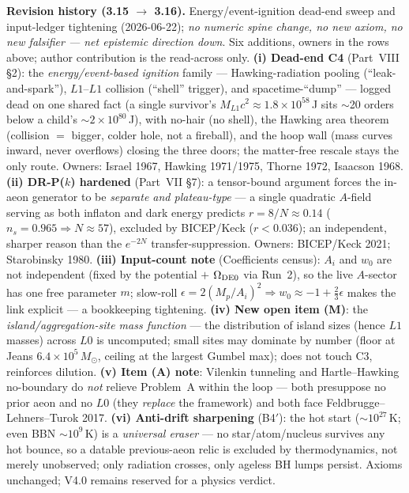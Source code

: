 \documentclass[11pt]{article}
\newcommand{\msun}{M_\odot}
\begin{document}
\smallskip\noindent\textbf{Revision history (3.15 $\to$ 3.16).} Energy/event-ignition dead-end sweep and input-ledger tightening (2026-06-22); \emph{no numeric spine change, no new axiom, no new falsifier --- net epistemic direction down}. Six additions, owners in the rows above; author contribution is the read-across only. \textbf{(i) Dead-end C4} (Part~VIII \S2): the \emph{energy/event-based ignition} family --- Hawking-radiation pooling (``leak-and-spark''), $L1$--$L1$ collision (``shell'' trigger), and spacetime-``dump'' --- logged dead on one shared fact (a single survivor's $M_{L1}c^2\approx1.8\times10^{58}$\,J sits $\sim$20 orders below a child's $\sim2\times10^{80}$\,J), with no-hair (no shell), the Hawking area theorem (collision $=$ bigger, colder hole, not a fireball), and the hoop wall (mass curves inward, never overflows) closing the three doors; the matter-free rescale stays the only route. Owners: Israel 1967, Hawking 1971/1975, Thorne 1972, Isaacson 1968. \textbf{(ii) DR-P($k$) hardened} (Part~VII \S7): a tensor-bound argument forces the in-aeon generator to be \emph{separate and plateau-type} --- a single quadratic $A$-field serving as both inflaton and dark energy predicts $r=8/N\approx0.14$ ($n_s=0.965\Rightarrow N\approx57$), excluded by BICEP/Keck ($r<0.036$); an independent, sharper reason than the $e^{-2N}$ transfer-suppression. Owners: BICEP/Keck 2021; Starobinsky 1980. \textbf{(iii) Input-count note} (Coefficients census): $A_i$ and $w_0$ are not independent (fixed by the potential $+$ $\Omega_{\rm DE0}$ via Run~2), so the live $A$-sector has one free parameter $m$; slow-roll $\epsilon=2(M_p/A_i)^2\Rightarrow w_0\approx-1+\tfrac23\epsilon$ makes the link explicit --- a bookkeeping tightening. \textbf{(iv) New open item (M)}: the \emph{island/aggregation-site mass function} --- the distribution of island sizes (hence $L1$ masses) across $L0$ is uncomputed; small sites may dominate by number (floor at Jeans $6.4\times10^{5}\,\msun$, ceiling at the largest Gumbel max); does not touch C3, reinforces dilution. \textbf{(v) Item (A) note}: Vilenkin tunneling and Hartle--Hawking no-boundary do \emph{not} relieve Problem~A within the loop --- both presuppose no prior aeon and no $L0$ (they \emph{replace} the framework) and both face Feldbrugge--Lehners--Turok 2017. \textbf{(vi) Anti-drift sharpening} (B4$'$): the hot start ($\sim10^{27}$\,K; even BBN $\sim10^{9}$\,K) is a \emph{universal eraser} --- no star/atom/nucleus survives any hot bounce, so a datable previous-aeon relic is excluded by thermodynamics, not merely unobserved; only radiation crosses, only ageless BH lumps persist. Axioms unchanged; V4.0 remains reserved for a physics verdict.
\end{document}
